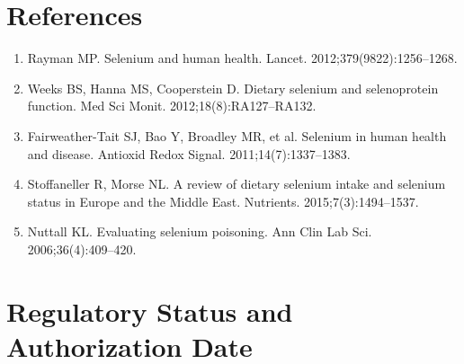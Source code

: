 \section*{References}
\begin{enumerate}
  \item Rayman MP. Selenium and human health. Lancet. 2012;379(9822):1256--1268.
  \item Weeks BS, Hanna MS, Cooperstein D. Dietary selenium and selenoprotein function. Med Sci Monit. 2012;18(8):RA127--RA132.
  \item Fairweather-Tait SJ, Bao Y, Broadley MR, et al. Selenium in human health and disease. Antioxid Redox Signal. 2011;14(7):1337--1383.
  \item Stoffaneller R, Morse NL. A review of dietary selenium intake and selenium status in Europe and the Middle East. Nutrients. 2015;7(3):1494--1537.
  \item Nuttall KL. Evaluating selenium poisoning. Ann Clin Lab Sci. 2006;36(4):409--420.
\end{enumerate}

\clearpage
\section*{Regulatory Status and Authorization Date}

\clearpage
